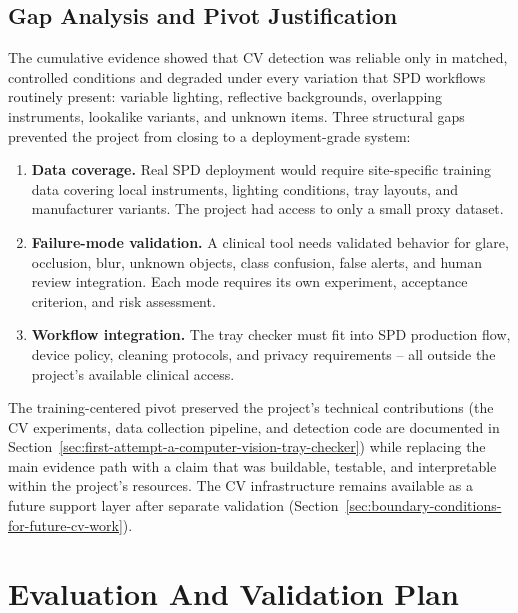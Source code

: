 \documentclass[10pt,a4paper]{article}
\begin{document}
\subsection{Gap Analysis and Pivot Justification}
\label{sec:gap-analysis-and-pivot-justification}

The cumulative evidence showed that CV detection was reliable only in matched,
controlled conditions and degraded under every variation that SPD workflows
routinely present: variable lighting, reflective backgrounds, overlapping
instruments, lookalike variants, and unknown items. Three structural gaps
prevented the project from closing to a deployment-grade system:

\begin{enumerate}
  \item \textbf{Data coverage.} Real SPD deployment would require site-specific
  training data covering local instruments, lighting conditions, tray layouts,
  and manufacturer variants. The project had access to only a small proxy
  dataset.
  \item \textbf{Failure-mode validation.} A clinical tool needs validated
  behavior for glare, occlusion, blur, unknown objects, class confusion,
  false alerts, and human review integration. Each mode requires its own
  experiment, acceptance criterion, and risk assessment.
  \item \textbf{Workflow integration.} The tray checker must fit into SPD
  production flow, device policy, cleaning protocols, and privacy
  requirements -- all outside the project's available clinical access.
\end{enumerate}

The training-centered pivot preserved the project's technical contributions
(the CV experiments, data collection pipeline, and detection code are
documented in Section~\ref{sec:first-attempt-a-computer-vision-tray-checker})
while replacing the main evidence path with a claim that was buildable,
testable, and interpretable within the project's resources. The CV infrastructure
remains available as a future support layer after separate validation
(Section~\ref{sec:boundary-conditions-for-future-cv-work}).




\section{Evaluation And Validation Plan}
\label{sec:evaluation-and-validation-plan}
\end{document}
